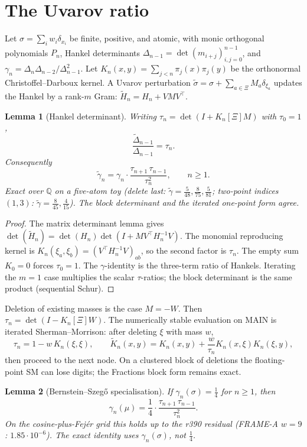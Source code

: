 \documentclass[11pt]{article}
\newtheorem{lemma}{Lemma}
\theoremstyle{remark}
\newcommand{\Q}{\mathbb{Q}}
\begin{document}
\section{The Uvarov ratio}\label{sec:uvarov}

Let $\sigma=\sum_i w_i\delta_{x_i}$ be finite, positive, and atomic,
with monic orthogonal polynomials $P_n$, Hankel determinants
$\Delta_{n-1}=\det(m_{i+j})_{i,j=0}^{n-1}$, and
$\gamma_n=\Delta_n\Delta_{n-2}/\Delta_{n-1}^2$.
Let $K_n(x,y)=\sum_{j<n}\pi_j(x)\pi_j(y)$ be the orthonormal
Christoffel--Darboux kernel.
A Uvarov perturbation $\tilde\sigma=\sigma+\sum_{a\in\Xi}M_a\delta_{\xi_a}$
updates the Hankel by a rank-$m$ Gram:
$\tilde H_n=H_n+VMV^\top$.

\begin{lemma}[Hankel determinant]\label{lem:hankel}
Writing $\tau_n=\det(I+K_n[\Xi]M)$ with $\tau_0=1$,
\[
\frac{\tilde\Delta_{n-1}}{\Delta_{n-1}}=\tau_n.
\]
Consequently
\[
\tilde\gamma_n
=
\gamma_n\cdot\frac{\tau_{n+1}\,\tau_{n-1}}{\tau_n^2},
\qquad n\ge 1.
\]
Exact over $\Q$ on a five-atom toy (delete last:
$\tilde\gamma=\tfrac5{48},\tfrac8{75},\tfrac5{81}$;
two-point indices $(1,3)$:
$\tilde\gamma=\tfrac8{45},\tfrac4{15}$).
The block determinant and the iterated one-point form agree.
\end{lemma}

\begin{proof}
The matrix determinant lemma gives
$\det(\tilde H_n)=\det(H_n)\det(I+MV^\top H_n^{-1}V)$.
The monomial reproducing kernel is
$K_n(\xi_a,\xi_b)=(V^\top H_n^{-1}V)_{ab}$, so the second factor is
$\tau_n$.
The empty sum $K_0=0$ forces $\tau_0=1$.
The $\gamma$-identity is the three-term ratio of Hankels.
Iterating the $m=1$ case multiplies the scalar $\tau$-ratios;
the block determinant is the same product (sequential Schur).
\end{proof}

Deletion of existing masses is the case $M=-W$.
Then $\tau_n=\det(I-K_n[\Xi]W)$.
The numerically stable evaluation on MAIN is iterated
Sherman--Morrison: after deleting $\xi$ with mass $w$,
\[
\tau_n=1-w\,K_n(\xi,\xi),
\qquad
\tilde K_n(x,y)=K_n(x,y)+\frac{w}{\tau_n}K_n(x,\xi)K_n(\xi,y),
\]
then proceed to the next node.
On a clustered block of deletions the floating-point SM can
lose digits; the Fractions block form remains exact.

\begin{lemma}[Bernstein--Szeg\H{o} specialisation]\label{lem:bs}
If $\gamma_n(\sigma)=\tfrac14$ for $n\ge 1$, then
\[
\gamma_n(\mu)=\frac14\cdot\frac{\tau_{n+1}\,\tau_{n-1}}{\tau_n^2}.
\]
On the cosine-plus-Fej\'er grid this holds up to the r390 residual
(FRAME-A $w=9$: $1.85\cdot10^{-6}$).
The exact identity uses $\gamma_n(\sigma)$, not $\tfrac14$.
\end{lemma}
\end{document}
